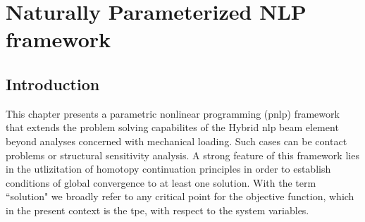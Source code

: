 \chapter{Naturally Parameterized NLP framework}\label{CH4}

\section{Introduction}\label{CH4S1}
This chapter presents a parametric nonlinear programming (\acrshort{pnlp}) 
framework
that extends the problem solving capabilites of the Hybrid \acrshort{nlp} beam 
element beyond analyses concerned with mechanical loading. Such cases can be 
contact problems or structural sensitivity analysis. A strong feature of this 
framework lies in the utlizitation of homotopy continuation principles
in order to establish conditions of global
convergence to at least one solution. With the term ``solution" we broadly 
refer to any critical point for the objective function, which in the present 
context is the \acrshort{tpe}, with respect to the system variables. 


